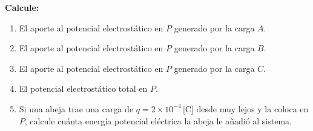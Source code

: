 \documentclass[12pt,letterpaper]{article}
\begin{document}
\vspace{0.7cm}

\noindent\textbf{Calcule:}
\begin{enumerate}
    \item El aporte al potencial electrost\'atico en $P$ generado por la carga $A$.
    \item El aporte al potencial electrost\'atico en $P$ generado por la carga $B$.
    \item El aporte al potencial electrost\'atico en $P$ generado por la carga $C$.
    \item El potencial electrost\'atico total en $P$.
    \item Si una abeja trae una carga de $q = 2\times10^{-4}$\,[C] desde muy lejos
          y la coloca en $P$, calcule cu\'anta energ\'ia potencial el\'ectrica la abeja
          le a\~nadi\'o al sistema.
\end{enumerate}
\end{document}
